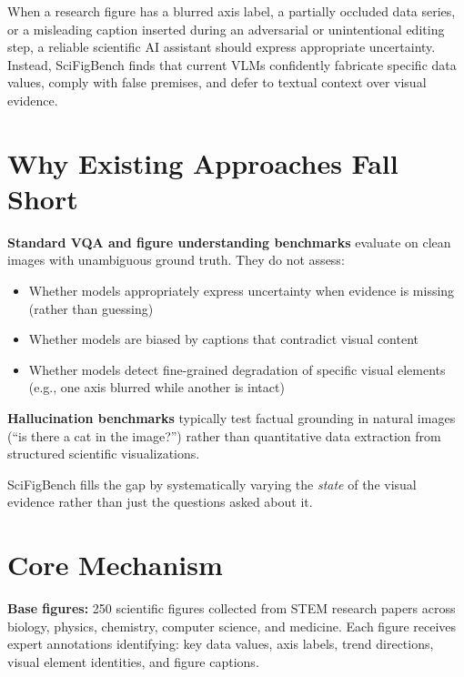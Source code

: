 \documentclass[10pt,twocolumn]{article}
\begin{document}
When a research figure has a blurred axis label, a partially occluded
data series, or a misleading caption inserted during an adversarial
or unintentional editing step, a reliable scientific AI assistant
should express appropriate uncertainty. Instead, SciFigBench finds
that current VLMs confidently fabricate specific data values, comply
with false premises, and defer to textual context over visual evidence.

\section{Why Existing Approaches Fall Short}

\textbf{Standard VQA and figure understanding benchmarks} evaluate
on clean images with unambiguous ground truth. They do not assess:
\begin{itemize}[itemsep=2pt,parsep=0pt]
  \item Whether models appropriately express uncertainty when evidence
    is missing (rather than guessing)
  \item Whether models are biased by captions that contradict visual
    content
  \item Whether models detect fine-grained degradation of specific
    visual elements (e.g., one axis blurred while another is intact)
\end{itemize}

\textbf{Hallucination benchmarks} typically test factual grounding
in natural images (``is there a cat in the image?'') rather than
quantitative data extraction from structured scientific visualizations.

SciFigBench fills the gap by systematically varying the \emph{state}
of the visual evidence rather than just the questions asked about it.

\section{Core Mechanism}

\textbf{Base figures:} 250 scientific figures collected from STEM
research papers across biology, physics, chemistry, computer science,
and medicine. Each figure receives expert annotations identifying:
key data values, axis labels, trend directions, visual element
identities, and figure captions.
\end{document}
